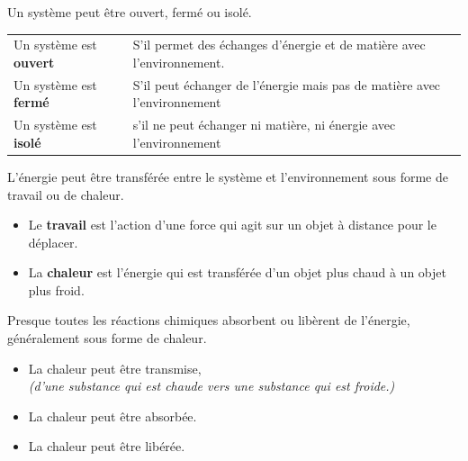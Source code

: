 \documentclass[
  11pt,
  french,
  a4paper,
  openany]{book}
\providecommand{\tightlist}{%
  \setlength{\itemsep}{0pt}\setlength{\parskip}{0pt}}
\begin{document}
Un système peut être ouvert, fermé ou isolé.

\begin{longtable}[]{@{}ll@{}}
\toprule
\endhead
\begin{minipage}[t]{0.25\columnwidth}\raggedright
Un système est \textbf{ouvert}\strut
\end{minipage} & \begin{minipage}[t]{0.69\columnwidth}\raggedright
S'il permet des échanges d'énergie et de matière avec l'environnement.\strut
\end{minipage}\tabularnewline
\begin{minipage}[t]{0.25\columnwidth}\raggedright
Un système est \textbf{fermé}\strut
\end{minipage} & \begin{minipage}[t]{0.69\columnwidth}\raggedright
S'il peut échanger de l'énergie mais pas de matière avec l'environnement\strut
\end{minipage}\tabularnewline
\begin{minipage}[t]{0.25\columnwidth}\raggedright
Un système est \textbf{isolé}\strut
\end{minipage} & \begin{minipage}[t]{0.69\columnwidth}\raggedright
s'il ne peut échanger ni matière, ni énergie avec l'environnement\strut
\end{minipage}\tabularnewline
\bottomrule
\end{longtable}

L'énergie peut être transférée entre le système et l'environnement sous forme de travail ou de chaleur.

\begin{itemize}
\tightlist
\item
  Le \textbf{travail} est l'action d'une force qui agit sur un objet à distance pour le déplacer.
\item
  La \textbf{chaleur} est l'énergie qui est transférée d'un objet plus chaud à un objet plus froid.
\end{itemize}

Presque toutes les réactions chimiques absorbent ou libèrent de l'énergie, généralement sous forme de chaleur.

\begin{itemize}
\tightlist
\item
  La chaleur peut être transmise,\\
  \emph{(d'une substance qui est chaude vers une substance qui est froide.)}
\item
  La chaleur peut être absorbée.
\item
  La chaleur peut être libérée.
\end{itemize}
\end{document}
